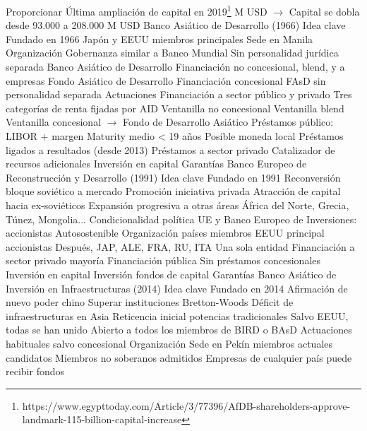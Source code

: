 \documentclass{nuevotema}
\begin{document}
\begin{esquemal}
				\4 Proporcionar
				\4 Última ampliación de capital en 2019\footnote{https://www.egypttoday.com/Article/3/77396/AfDB-shareholders-approve-landmark-115-billion-capital-increase}
				 M USD
				\4[] $\to$ Capital se dobla desde 93.000 a 208.000 M USD
		\2 Banco Asiático de Desarrollo (1966)
			\3 Idea clave
				\4 Fundado en 1966
				\4 Japón y EEUU miembros principales
				\4 Sede en Manila
			\3 Organización
				\4 Gobernanza similar a Banco Mundial
				\4 Sin personalidad jurídica separada
				\4 Banco Asiático de Desarrollo
				\4[] Financiación no concesional, blend, y a empresas
				\4 Fondo Asiático de Desarrollo
				\4[] Financiación concesional
				\4[] FAsD sin personalidad separada
			\3 Actuaciones
				\4 Financiación a sector público y privado
				\4 Tres categorías de renta fijadas por AID
				\4[] Ventanilla no concesional
				\4[] Ventanilla blend
				\4[] Ventanilla concesional $\to$ Fondo de Desarrollo Asiático
				\4 Préstamos público: LIBOR + margen
				\4[] Maturity medio < 19 años
				\4[] Posible moneda local
				\4 Préstamos ligados a resultados (desde 2013)
				\4 Préstamos a sector privado
				\4[] Catalizador de recursos adicionales
				\4 Inversión en capital
				\4 Garantías
		\2 Banco Europeo de Reconstrucción y Desarrollo (1991)
			\3 Idea clave
				\4 Fundado en 1991
				\4 Reconversión bloque soviético a mercado
				\4 Promoción iniciativa privada
				\4 Atracción de capital hacia ex-soviéticos
				\4 Expansión progresiva a otras áreas
				\4[] África del Norte, Grecia, Túnez, Mongolia...
				\4 Condicionalidad política
				\4 UE y Banco Europeo de Inversiones: accionistas
				\4 Autosostenible
			\3 Organización
				 países miembros
				\4 EEUU principal accionistas
				\4 Después, JAP, ALE, FRA, RU, ITA
				\4 Una sola entidad
				\4[] Financiación a sector privado mayoría
				\4[] Financiación pública
				\4[] Sin préstamos concesionales
				\4[] Inversión en capital
				\4[] Inversión fondos de capital
				\4[] Garantías
		\2 Banco Asiático de Inversión en Infraestructuras (2014)
			\3 Idea clave
				\4 Fundado en 2014
				\4 Afirmación de nuevo poder chino
				\4[] Superar instituciones Bretton-Woods
				\4 Déficit de infraestructuras en Asia
				\4 Reticencia inicial potencias tradicionales
				\4 Salvo EEUU, todas se han unido
				\4 Abierto a todos los miembros de BIRD o BAsD
				\4 Actuaciones habituales salvo concesional
			\3 Organización
				\4 Sede en Pekín
				 miembros actuales
				 candidatos
				\4 Miembros no soberanos admitidos
				\4 Empresas de cualquier país puede recibir fondos

\end{esquemal}
\end{document}
